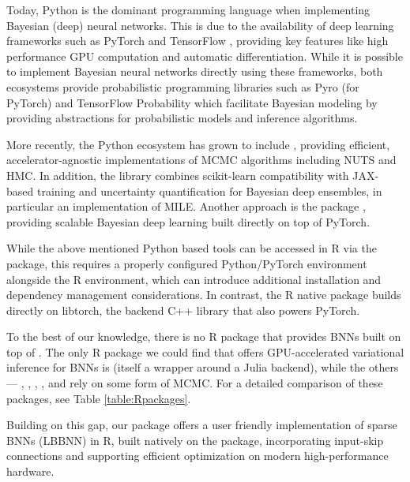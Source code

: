 Today, Python is the dominant programming language when implementing Bayesian (deep) neural networks. This is due to the availability of deep learning frameworks such as PyTorch \citep{paszke2019pytorch} and TensorFlow \citep{tensorflow2015-whitepaper}, providing key features like high performance GPU computation and automatic differentiation. While it is possible to implement Bayesian neural networks directly using these frameworks, both ecosystems provide probabilistic programming libraries such as Pyro \citep{bingham2019pyro} (for PyTorch) and TensorFlow Probability \citep{dillon2017tensorflow} which facilitate Bayesian modeling by providing abstractions for probabilistic models and inference algorithms. 

More recently, the Python ecosystem has grown to include  \citep{cabezas2024blackjax}, providing efficient, accelerator-agnostic implementations of MCMC algorithms including NUTS and HMC. In addition, the  \citep{arvanitis2026bde} library combines scikit-learn compatibility with JAX-based training and uncertainty quantification for Bayesian deep ensembles, in particular an implementation of MILE. Another approach is the  package \citep{duffield2024scalable}, providing scalable Bayesian deep learning built directly on top of PyTorch.

While the above mentioned Python based tools can be accessed in R via the  \citep{reticulate} package, this requires a properly configured Python/PyTorch environment alongside the R environment, which can introduce additional installation and dependency management considerations. In contrast, the R native  \citep{torchR} package builds directly on libtorch, the backend C++ library that also powers PyTorch.

To the best of our knowledge, there is no R package that provides BNNs built on top of . The only R package we could find that offers GPU-accelerated variational inference for BNNs is  \citep{bayesfluxr} (itself a wrapper around a Julia backend), while the others ---  \citep{bnns},  \citep{liang2018bayesian},  \citep{sharaf2020blnn},   \citep{boomspikeslab}, and  \citep{mcinerney2025statistical} rely on some form of MCMC. For a detailed comparison of these packages, see Table \ref{table:Rpackages}. 

Building on this gap, our  package offers a user friendly implementation of sparse BNNs (LBBNN) in R, built natively on the  package, incorporating input-skip connections and supporting efficient optimization on modern high-performance hardware.

